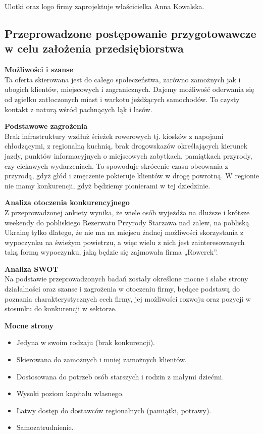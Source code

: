 \documentclass{sprawozdanie-agh}
\begin{document}
		Ulotki oraz logo firmy zaprojektuje właścicielka Anna Kowalska.
		
		\subsection{Przeprowadzone postępowanie przygotowawcze w celu założenia przedsiębiorstwa}

		\textbf{Możliwości i szanse}\\
		Ta oferta skierowana jest do całego społeczeństwa, zarówno zamożnych jak i ubogich klientów, miejscowych i zagranicznych. Dajemy możliwość oderwania się od zgiełku zatłoczonych miast i warkotu jeżdżących samochodów. To czysty kontakt z naturą wśród pachnących łąk i lasów.
		
		\textbf{Podstawowe zagrożenia}\\
		Brak infrastruktury wzdłuż ścieżek rowerowych tj. kiosków z napojami chłodzącymi, z regionalną kuchnią, brak drogowskazów określających kierunek jazdy, punktów informacyjnych o miejscowych zabytkach, pamiątkach przyrody, czy ciekawych wydarzeniach. To spowoduje skrócenie czasu obcowania z przyrodą, gdyż głód i zmęczenie pokieruje klientów w drogę powrotną. W regionie nie mamy konkurencji, gdyż będziemy pionierami w tej dziedzinie.
		
		\textbf{Analiza otoczenia konkurencyjnego}\\
		Z przeprowadzonej ankiety wynika, że wiele osób wyjeżdża na dłuższe i krótsze weekendy do pobliskiego Rezerwatu Przyrody Starzawa nad zalew, na pobliską Ukrainę tylko dlatego, że nie ma na miejscu żadnej możliwości skorzystania z wypoczynku na świeżym powietrzu, a więc wielu z nich jest zainteresowanych taką formą wypoczynku, jaką będzie się zajmowała firma „Rowerek”.
				
		\textbf{Analiza SWOT}\\
		Na podstawie przeprowadzonych badań zostały określone mocne i słabe strony działalności oraz szanse i zagrożenia w otoczeniu firmy, będące podstawą do poznania charakterystycznych cech firmy, jej możliwości rozwoju oraz pozycji w stosunku do konkurencji w sektorze.
		
		\textbf{Mocne strony}
		\begin{itemize}
			\item Jedyna w swoim rodzaju (brak konkurencji).
			\item Skierowana do zamożnych i mniej zamożnych klientów.
			\item Dostosowana do potrzeb osób starszych i rodzin z małymi dziećmi.
			\item Wysoki poziom kapitału własnego.
			\item Łatwy dostęp do dostawców regionalnych (pamiątki, potrawy).
			\item Samozatrudnienie.
		\end{itemize}
		
\end{document}
